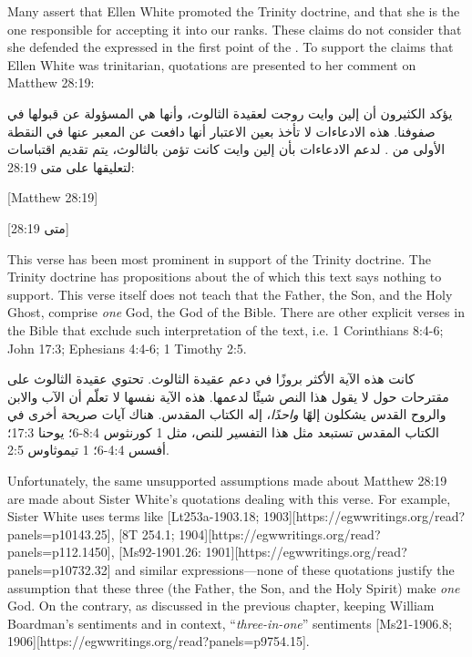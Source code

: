 



Many assert that Ellen White promoted the Trinity doctrine, and that she is the one responsible for accepting it into our ranks. These claims do not consider that she defended the  expressed in the first point of the . To support the claims that Ellen White was trinitarian, quotations are presented to her comment on Matthew 28:19:


يؤكد الكثيرون أن إلين وايت روجت لعقيدة الثالوث، وأنها هي المسؤولة عن قبولها في صفوفنا. هذه الادعاءات لا تأخذ بعين الاعتبار أنها دافعت عن  المعبر عنها في النقطة الأولى من . لدعم الادعاءات بأن إلين وايت كانت تؤمن بالثالوث، يتم تقديم اقتباسات لتعليقها على متى 28:19:


[Matthew 28:19]


[متى 28:19]


This verse has been most prominent in support of the Trinity doctrine. The Trinity doctrine has propositions about the  of which this text says nothing to support. This verse itself does not teach that the Father, the Son, and the Holy Ghost, comprise \textit{one} God, the God of the Bible. There are other explicit verses in the Bible that exclude such interpretation of the text, i.e. 1 Corinthians 8:4-6; John 17:3; Ephesians 4:4-6; 1 Timothy 2:5.


كانت هذه الآية الأكثر بروزًا في دعم عقيدة الثالوث. تحتوي عقيدة الثالوث على مقترحات حول  لا يقول هذا النص شيئًا لدعمها. هذه الآية نفسها لا تعلّم أن الآب والابن والروح القدس يشكلون إلهًا \textit{واحدًا}، إله الكتاب المقدس. هناك آيات صريحة أخرى في الكتاب المقدس تستبعد مثل هذا التفسير للنص، مثل 1 كورنثوس 8:4-6؛ يوحنا 17:3؛ أفسس 4:4-6؛ 1 تيموثاوس 2:5.


Unfortunately, the same unsupported assumptions made about Matthew 28:19 are made about Sister White’s quotations dealing with this verse. For example, Sister White uses terms like [Lt253a-1903.18; 1903][https://egwwritings.org/read?panels=p10143.25], [8T 254.1; 1904][https://egwwritings.org/read?panels=p112.1450], [Ms92-1901.26: 1901][https://egwwritings.org/read?panels=p10732.32] and similar expressions—none of these quotations justify the assumption that these three (the Father, the Son, and the Holy Spirit) make \textit{one} God. On the contrary, as discussed in the previous chapter, keeping William Boardman’s sentiments and  in context, “\textit{three-in-one}” sentiments [Ms21-1906.8; 1906][https://egwwritings.org/read?panels=p9754.15].



